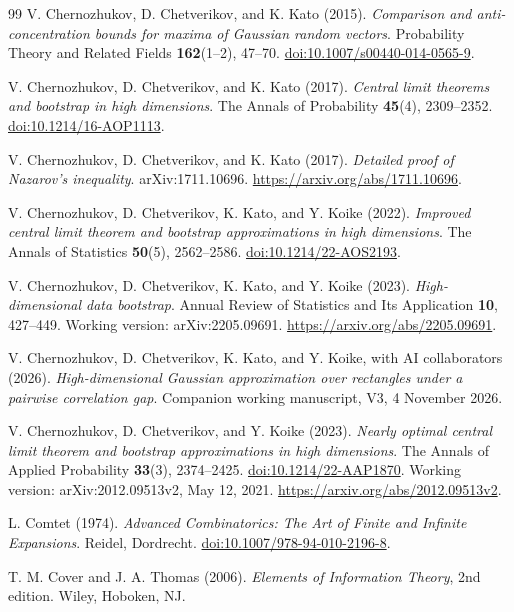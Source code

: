 \documentclass[11pt,letterpaper]{article}
\newenvironment{recovered}{}{}
\theoremstyle{remark}
\begin{document}
\begin{thebibliography}{99}
{
V. Chernozhukov, D. Chetverikov, and K. Kato (2015).
\emph{Comparison and anti-concentration bounds for maxima of Gaussian
random vectors}.
Probability Theory and Related Fields \textbf{162}(1--2), 47--70.
\href{https://doi.org/10.1007/s00440-014-0565-9}{doi:10.1007/s00440-014-0565-9}.}

V. Chernozhukov, D. Chetverikov, and K. Kato (2017).
\emph{Central limit theorems and bootstrap in high dimensions}.
The Annals of Probability \textbf{45}(4), 2309--2352.
\href{https://doi.org/10.1214/16-AOP1113}{doi:10.1214/16-AOP1113}.

V. Chernozhukov, D. Chetverikov, and K. Kato (2017).
\emph{Detailed proof of Nazarov's inequality}.
arXiv:1711.10696.
\url{https://arxiv.org/abs/1711.10696}.

V. Chernozhukov, D. Chetverikov, K. Kato, and Y. Koike (2022).
\emph{Improved central limit theorem and bootstrap approximations in
high dimensions}. The Annals of Statistics \textbf{50}(5), 2562--2586.
\href{https://doi.org/10.1214/22-AOS2193}{doi:10.1214/22-AOS2193}.

V. Chernozhukov, D. Chetverikov, K. Kato, and Y. Koike (2023).
\emph{High-dimensional data bootstrap}.
Annual Review of Statistics and Its Application \textbf{10}, 427--449.
Working version: arXiv:2205.09691.
\url{https://arxiv.org/abs/2205.09691}.

\begin{recovered}
V. Chernozhukov, D. Chetverikov, K. Kato, and Y. Koike,
with AI collaborators (2026).
\emph{High-dimensional Gaussian approximation over rectangles under
a pairwise correlation gap}. Companion working manuscript, V3,
4 November 2026.
\end{recovered}

V. Chernozhukov, D. Chetverikov, and Y. Koike (2023).
\emph{Nearly optimal central limit theorem and bootstrap approximations
in high dimensions}.
The Annals of Applied Probability \textbf{33}(3), 2374--2425.
\href{https://doi.org/10.1214/22-AAP1870}{doi:10.1214/22-AAP1870}.
Working version: arXiv:2012.09513v2, May 12, 2021.
\url{https://arxiv.org/abs/2012.09513v2}.

L. Comtet (1974).
\emph{Advanced Combinatorics: The Art of Finite and Infinite Expansions}.
Reidel, Dordrecht.
\href{https://doi.org/10.1007/978-94-010-2196-8}{doi:10.1007/978-94-010-2196-8}.

T. M. Cover and J. A. Thomas (2006).
\emph{Elements of Information Theory}, 2nd edition.
Wiley, Hoboken, NJ.


\end{thebibliography}
\end{document}
